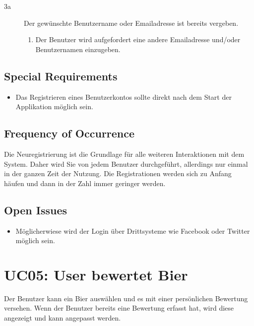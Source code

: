 \documentclass[10pt,a4paper]{scrartcl}
\begin{document}
\begin{description}
\item[3a] Der gewünschte Benutzername oder Emailadresse ist bereits vergeben.
	\begin{enumerate}
	\item Der Benutzer wird aufgefordert eine andere Emailadresse und/oder Benutzernamen 		einzugeben.
	\end{enumerate}

\end{description}


\subsection*{Special Requirements}

\begin{itemize}
\item Das Registrieren eines Benutzerkontos sollte direkt nach dem Start der Applikation möglich sein. 
\end{itemize}



\subsection*{Frequency of Occurrence}

Die Neuregistrierung ist die Grundlage für alle weiteren Interaktionen mit dem System. Daher wird Sie von jedem Benutzer durchgeführt, allerdings nur einmal in der ganzen Zeit der Nutzung. Die Registrationen werden sich zu Anfang häufen und dann in der Zahl immer geringer werden.


\subsection*{Open Issues}

\begin{itemize}
\item Möglicherwiese wird der Login über Drittsysteme wie Facebook oder Twitter möglich sein.
\end{itemize}


\section*{UC05: User bewertet Bier}
Der Benutzer kann ein Bier auswählen und es mit einer persönlichen Bewertung versehen. Wenn der Benutzer bereits eine Bewertung erfasst hat, wird diese angezeigt und kann angepasst werden.
\end{document}
